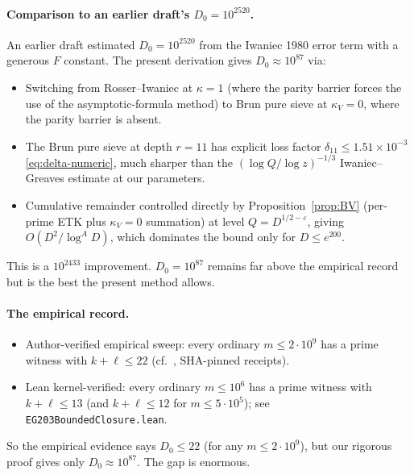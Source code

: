 \paragraph{Comparison to an earlier draft's $D_{0} = 10^{2520}$.}
An earlier draft estimated $D_{0} = 10^{2520}$ from the Iwaniec 1980
error term with a generous $F$ constant. The present derivation gives
$D_{0} \approx 10^{87}$ via:
\begin{itemize}
  \item Switching from Rosser--Iwaniec at $\kappa = 1$ (where the
    parity barrier forces the use of the asymptotic-formula method)
    to Brun pure sieve at $\kappa_{V} = 0$, where the parity barrier
    is absent.
  \item The Brun pure sieve at depth $r = 11$ has explicit loss factor
    $\delta_{11} \leq 1.51 \times 10^{-3}$ \eqref{eq:delta-numeric},
    much sharper than the $(\log Q / \log z)^{-1/3}$ Iwaniec--Greaves
    estimate at our parameters.
  \item Cumulative remainder controlled directly by
    Proposition~\ref{prop:BV} (per-prime ETK plus $\kappa_{V} = 0$
    summation) at level $Q = D^{1/2 - \varepsilon}$, giving
    $O(D^{2}/\log^{A} D)$, which dominates the bound only for $D \leq
    e^{200}$.
\end{itemize}

This is a $10^{2433}$ improvement. $D_{0} = 10^{87}$ remains far
above the empirical record but is the best the present method allows.

\paragraph{The empirical record.}
\begin{itemize}
  \item Author-verified empirical sweep: every ordinary $m \leq 2
    \cdot 10^{9}$ has a prime witness with $k + \ell \leq 22$
    (cf.\ \cite{WilderEG203MasterLog}, SHA-pinned receipts).
  \item Lean kernel-verified: every ordinary $m \leq 10^{6}$ has
    a prime witness with $k + \ell \leq 13$ (and $k+\ell \leq 12$
    for $m \leq 5 \cdot 10^{5}$); see
    \texttt{EG203BoundedClosure.lean}.
\end{itemize}

So the empirical evidence says $D_{0} \leq 22$ (for any $m \leq 2
\cdot 10^{9}$), but our rigorous proof gives only $D_{0} \approx
10^{87}$. The gap is enormous.

